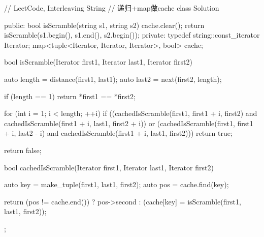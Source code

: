 \begin{Code}
// LeetCode, Interleaving String
// 递归+map做cache
class Solution {
public:
    bool isScramble(string s1, string s2) {
        cache.clear();
        return isScramble(s1.begin(), s1.end(), s2.begin());
    }
private:
    typedef string::const_iterator Iterator;
    map<tuple<Iterator, Iterator, Iterator>, bool> cache;

    bool isScramble(Iterator first1, Iterator last1, Iterator first2) {
        auto length = distance(first1, last1);
        auto last2 = next(first2, length);

        if (length == 1) return *first1 == *first2;

        for (int i = 1; i < length; ++i)
            if ((cachedIsScramble(first1, first1 + i, first2)
                    and cachedIsScramble(first1 + i, last1, first2 + i))
                    or (cachedIsScramble(first1, first1 + i, last2 - i)
                            and cachedIsScramble(first1 + i, last1, first2)))
                return true;

        return false;
    }

    bool cachedIsScramble(Iterator first1, Iterator last1, Iterator first2) {
        auto key = make_tuple(first1, last1, first2);
        auto pos = cache.find(key);

        return (pos != cache.end()) ?
                pos->second : (cache[key] = isScramble(first1, last1, first2));
    }
};
\end{Code}

